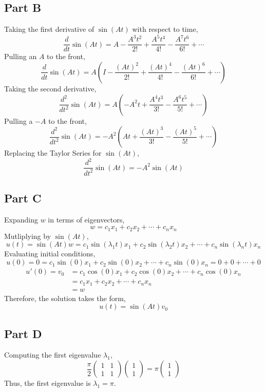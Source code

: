 \documentclass{article}
\begin{document}
\subsection*{Part B}

Taking the first derivative of $\sin(At)$ with respect to time,
$$ \frac{d}{dt} \sin(At) = A - \frac{A^3 t^2}{2!} + \frac{A^5 t^4}{4!} -
\frac{A^7 t^6}{6!} + \cdots $$
Pulling an $A$ to the front,
$$ \frac{d}{dt} \sin(At) = A \left(I - \frac{(At)^2}{2!} + \frac{(At)^4}{4!}
- \frac{(At)^6}{6!} + \cdots\right) $$
Taking the second derivative,
$$ \frac{d^2}{dt^2} \sin(At) = A \left(-A^2 t + \frac{A^4 t^3}{3!} -
\frac{A^6 t^5}{5!} + \cdots\right) $$
Pulling a $-A$ to the front,
$$ \frac{d^2}{dt^2} \sin(At) = -A^2 \left(At + \frac{(At)^3}{3!} -
\frac{(At)^5}{5!} + \cdots \right) $$
Replacing the Taylor Series for $\sin(At)$,
$$ \frac{d^2}{dt^2} \sin(At) = -A^2 \sin(At) $$

\subsection*{Part C}

Expanding $w$ in terms of eigenvectors,
$$ w = c_1 x_1 + c_2 x_2 + \cdots + c_n x_n $$
Mutliplying by $\sin(At)$,
$$ u(t) = \sin(At) w = c_1 \sin(\lambda_1 t) x_1 + c_2 \sin(\lambda_2 t) x_2
+ \cdots + c_n \sin(\lambda_n t) x_n $$
Evaluating initial conditions,
$$ u(0) = 0 = c_1 \sin(0) x_1 + c_2 \sin(0) x_2 + \cdots + c_n \sin(0) x_n =
0 + 0 + \cdots + 0 $$
\begin{align*}
  u'(0) = v_0 &= c_1 \cos(0) x_1 + c_2 \cos(0) x_2 + \cdots + c_n \cos(0) x_n \\
  &= c_1 x_1 + c_2 x_2 + \cdots + c_n x_n \\
  &= w
\end{align*}
Therefore, the solution takes the form,
$$ u(t) = \sin(At) v_0 $$

\subsection*{Part D}

Computing the first eigenvalue $\lambda_1$,
$$ \frac{\pi}{2} \begin{pmatrix}
  1 & 1 \\
  1 & 1 
\end{pmatrix} \begin{pmatrix}
  1 \\
  1
\end{pmatrix} = \pi \begin{pmatrix}
  1 \\
  1
\end{pmatrix} $$
Thus, the first eigenvalue is $\lambda_1 = \pi$.
\end{document}
